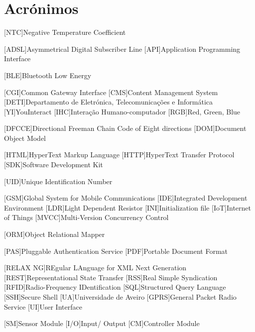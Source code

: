 \chapter*{Acrónimos}

\begin{acronym}[RELAX NG]
	
	[NTC]{Negative Temperature Coefficient}
			
	[ADSL]{Asymmetrical Digital Subscriber Line}
	[API]{Application Programming Interface}
	
	[BLE]{Bluetooth Low Energy}
	
	[CGI]{Common Gateway Interface}
	[CMS]{Content Management System}
	[DETI]{Departamento de Eletrónica, Telecomunicações e Informática}
	[YI]{YouInteract}		
	[IHC]{Interação Humano-computador}	
	[RGB]{Red, Green, Blue}
	
	[DFCCE]{Directional Freeman Chain Code of Eight directions}
	[DOM]{Document Object Model}
	
	[HTML]{HyperText Markup Language}
	[HTTP]{HyperText Transfer Protocol}		
	[SDK]{Software Development Kit}
	
	[UID]{Unique Identification Number}
	
	
	[GSM]{Global System for Mobile Communications}
	[IDE]{Integrated Development Environment}
	[LDR]{Light Dependent Resistor}
	[INI]{Initialization file}	
	[IoT]{Internet of Things}			
	[MVCC]{Multi-Version Concurrency Control}		

	[ORM]{Object Relational Mapper}
	
	[PAS]{Pluggable Authentication Service}
	[PDF]{Portable Document Format}
	
	[RELAX NG]{REgular LAnguage for XML Next Generation}
	[REST]{Representational State Transfer}
	[RSS]{Real Simple Syndication}
	[RFID]{Radio-Frequency IDentification}
	[SQL]{Structured Query Language}		
	[SSH]{Secure Shell}
	[UA]{Universidade de Aveiro}
	[GPRS]{General Packet Radio Service}
	[UI]{User Interface}
	
	[SM]{Sensor Module}
	[I/O]{Input/ Output}
	[CM]{Controller Module}
	

\end{acronym}
